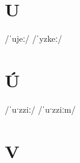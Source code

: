 \documentclass[10pt,a4paper,twoside]{book}
\begin{document}
\section*{U}

\begin{multicols}{3}
 {/ˈujeː/} {}
 {/ˈyzkeː/} {}
\end{multicols}

\section*{Ú}

\begin{multicols}{3}
 {/ˈuˑzziː/} {}
 {/ˈuˑzziːm/} {}
\end{multicols}

\section*{V}
\end{document}
